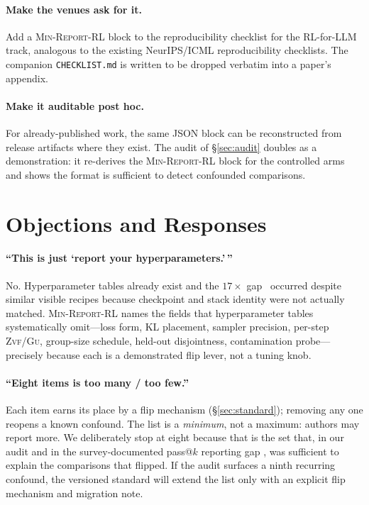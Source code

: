 \documentclass[11pt]{article}
\newcommand{\zvf}{\textsc{Zvf}}
\newcommand{\gu}{\textsc{Gu}}
\newcommand{\minreport}{\textsc{Min-Report-RL}}
\begin{document}
\paragraph{Make the venues ask for it.}
Add a \minreport{} block to the reproducibility checklist for the RL-for-LLM
track, analogous to the existing NeurIPS/ICML reproducibility checklists. The
companion \texttt{CHECKLIST.md} is written to be dropped verbatim into a paper's
appendix.

\paragraph{Make it auditable post hoc.}
For already-published work, the same JSON block can be reconstructed from
release artifacts where they exist. The audit of \S\ref{sec:audit} doubles as a
demonstration: it re-derives the \minreport{} block for the controlled arms and shows
the format is sufficient to detect confounded comparisons.

\section{Objections and Responses}
\label{sec:objections}


\paragraph{``This is just `report your hyperparameters.'\,''}
No. Hyperparameter tables already exist and the $17\times$ gap~\citep{zvfaudit2026} occurred
despite similar visible recipes because checkpoint and stack identity were not
actually matched. \minreport{} names the fields
that hyperparameter tables systematically omit---loss form, KL placement,
sampler precision, per-step \zvf{}/\gu{}, group-size schedule, held-out
disjointness, contamination probe---precisely because each is a demonstrated
flip lever, not a tuning knob.

\paragraph{``Eight items is too many / too few.''}
Each item earns its place by a flip mechanism (\S\ref{sec:standard}); removing
any one reopens a known confound. The list is a \emph{minimum}, not a maximum:
authors may report more. We deliberately stop at eight because that is the set
that, in our audit and in the survey-documented pass@$k$ reporting gap
\cite{agenticrlsurvey2026}, was sufficient to explain the comparisons that
flipped.
If the audit surfaces a ninth recurring confound, the versioned standard will
extend the list only with an explicit flip mechanism and migration note.
\end{document}

